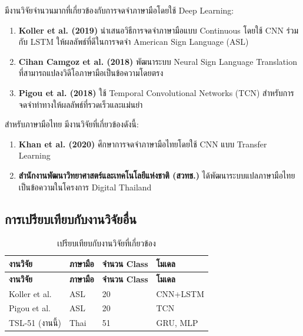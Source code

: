 \documentclass[12pt,a4paper]{report}
\begin{document}
มีงานวิจัยจำนวนมากที่เกี่ยวข้องกับการจดจำภาษามือโดยใช้ Deep Learning:

\begin{enumerate}
    \item \textbf{Koller et al. (2019)} นำเสนอวิธีการจดจำภาษามือแบบ Continuous 
    โดยใช้ CNN ร่วมกับ LSTM ให้ผลลัพธ์ที่ดีในการจดจำ American Sign Language (ASL)
    
    \item \textbf{Cihan Camgoz et al. (2018)} พัฒนาระบบ Neural Sign Language Translation 
    ที่สามารถแปลงวิดีโอภาษามือเป็นข้อความโดยตรง
    
    \item \textbf{Pigou et al. (2018)} ใช้ Temporal Convolutional Networks (TCN) 
    สำหรับการจดจำท่าทางให้ผลลัพธ์ที่รวดเร็วและแม่นยำ
\end{enumerate}

สำหรับภาษามือไทย มีงานวิจัยที่เกี่ยวข้องดังนี้:

\begin{enumerate}
    \item \textbf{Khan et al. (2020)} ศึกษาการจดจำภาษามือไทยโดยใช้ CNN แบบ Transfer Learning
    
    \item \textbf{สำนักงานพัฒนาวิทยาศาสตร์และเทคโนโลยีแห่งชาติ (สวทช.)} 
    ได้พัฒนาระบบแปลภาษามือไทยเป็นข้อความในโครงการ Digital Thailand
\end{enumerate}

\subsection{การเปรียบเทียบกับงานวิจัยอื่น}

\begin{longtable}{|p{3cm}|p{3cm}|p{3cm}|p{3cm}|}
\caption{เปรียบเทียบกับงานวิจัยที่เกี่ยวข้อง}
\label{tab:comparison} \\
\hline
\textbf{งานวิจัย} & \textbf{ภาษามือ} & \textbf{จำนวน Class} & \textbf{โมเดล} \\
\hline
\endfirsthead
\hline
\textbf{งานวิจัย} & \textbf{ภาษามือ} & \textbf{จำนวน Class} & \textbf{โมเดล} \\
\hline
\endhead
\hline
Koller et al. & ASL & 20 & CNN+LSTM \\
\hline
Pigou et al. & ASL & 20 & TCN \\
\hline
TSL-51 (งานนี้) & Thai & 51 & GRU, MLP \\
\hline
\end{longtable}
\end{document}
